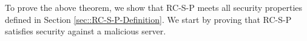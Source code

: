  To prove the above theorem, we show that RC-S-P meets all security properties defined in Section \ref{sec::RC-S-P-Definition}.  We start by proving that RC-S-P satisfies security against a malicious server.  
 
 
 
 
%


%




